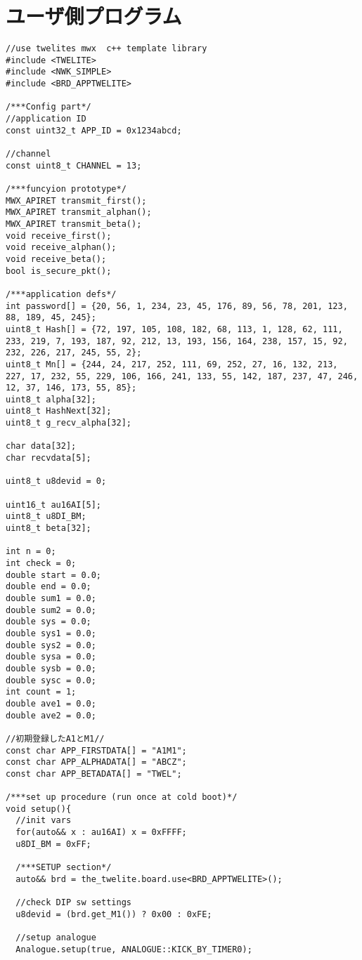 \documentclass{thesis}
\begin{document}
\section{ユーザ側プログラム}
\begin{lstlisting}
//use twelites mwx  c++ template library
#include <TWELITE>
#include <NWK_SIMPLE>
#include <BRD_APPTWELITE>

/***Config part*/
//application ID
const uint32_t APP_ID = 0x1234abcd;

//channel
const uint8_t CHANNEL = 13;

/***funcyion prototype*/
MWX_APIRET transmit_first();
MWX_APIRET transmit_alphan();
MWX_APIRET transmit_beta();
void receive_first();
void receive_alphan();
void receive_beta();
bool is_secure_pkt();

/***application defs*/
int password[] = {20, 56, 1, 234, 23, 45, 176, 89, 56, 78, 201, 123, 88, 189, 45, 245};
uint8_t Hash[] = {72, 197, 105, 108, 182, 68, 113, 1, 128, 62, 111, 233, 219, 7, 193, 187, 92, 212, 13, 193, 156, 164, 238, 157, 15, 92, 232, 226, 217, 245, 55, 2};
uint8_t Mn[] = {244, 24, 217, 252, 111, 69, 252, 27, 16, 132, 213, 227, 17, 232, 55, 229, 106, 166, 241, 133, 55, 142, 187, 237, 47, 246, 12, 37, 146, 173, 55, 85};
uint8_t alpha[32];
uint8_t HashNext[32];
uint8_t g_recv_alpha[32];

char data[32];
char recvdata[5];

uint8_t u8devid = 0;

uint16_t au16AI[5];
uint8_t u8DI_BM;
uint8_t beta[32];

int n = 0;
int check = 0;
double start = 0.0;
double end = 0.0;
double sum1 = 0.0;
double sum2 = 0.0;
double sys = 0.0;
double sys1 = 0.0;
double sys2 = 0.0;
double sysa = 0.0;
double sysb = 0.0;
double sysc = 0.0;
int count = 1;
double ave1 = 0.0;
double ave2 = 0.0;

//初期登録したA1とM1//
const char APP_FIRSTDATA[] = "A1M1";
const char APP_ALPHADATA[] = "ABCZ";
const char APP_BETADATA[] = "TWEL";

/***set up procedure (run once at cold boot)*/
void setup(){
  //init vars
  for(auto&& x : au16AI) x = 0xFFFF;
  u8DI_BM = 0xFF;

  /***SETUP section*/
  auto&& brd = the_twelite.board.use<BRD_APPTWELITE>();

  //check DIP sw settings
  u8devid = (brd.get_M1()) ? 0x00 : 0xFE;

  //setup analogue
  Analogue.setup(true, ANALOGUE::KICK_BY_TIMER0);


\end{lstlisting}
\end{document}
